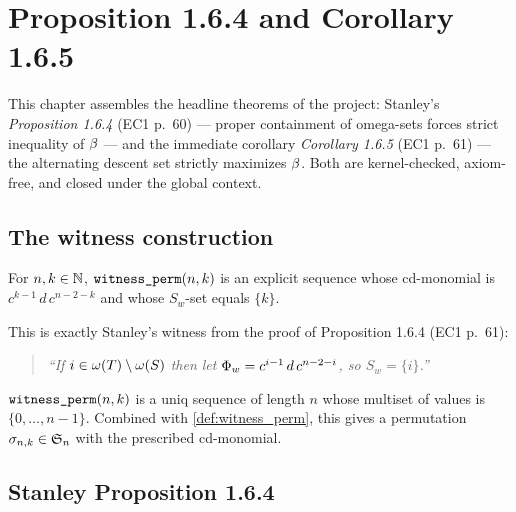 \chapter{Proposition 1.6.4 and Corollary 1.6.5}
\label{ch:propositions}

This chapter assembles the headline theorems of the project: Stanley's
\emph{Proposition 1.6.4} (EC1 p.~60) — proper containment of omega-sets
forces strict inequality of $\beta$ — and the immediate corollary
\emph{Corollary 1.6.5} (EC1 p.~61) — the alternating descent set
strictly maximizes $\beta$.  Both are kernel-checked, axiom-free,
and closed under the global context.

\section{The witness construction}

\begin{definition}[Stanley's witness $\PhiW{w} = c^{i-1}\,d\,c^{n-2-i}$]
  \label{def:witness_perm}
  \rocqok
  For $n, k \in \mathbb{N}$, $\texttt{witness\_perm}(n, k)$ is an explicit
  sequence whose cd-monomial is $c^{k-1}\,d\,c^{n-2-k}$ and whose
  $S_w$-set equals $\{k\}$.

  This is exactly Stanley's witness from the proof of Proposition
  1.6.4 (EC1 p.~61):
  \begin{quote}
    \emph{``If $i \in \omega(T) \setminus \omega(S)$ then let
    $\PhiW{w} = c^{i-1}\,d\,c^{n-2-i}$, so $S_w = \{i\}$.''}
  \end{quote}
\end{definition}

\begin{lemma}
  \label{lem:witness_perm_uniq}
  \rocqok
  $\texttt{witness\_perm}(n, k)$ is a uniq sequence of length $n$ whose
  multiset of values is $\{0, \dots, n-1\}$.  Combined with
  \cref{def:witness_perm}, this gives a permutation
  $\sigma_{n, k} \in \mathfrak{S}_{n}$ with the prescribed cd-monomial.
\end{lemma}

\section{Stanley Proposition 1.6.4}

